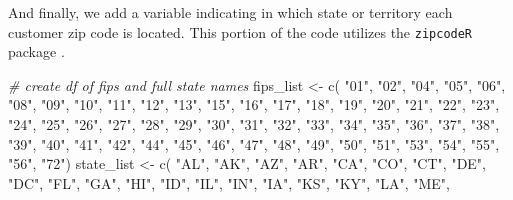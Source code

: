 \documentclass[
  11 pt,
  openany]{book}
\newenvironment{Shaded}{\begin{snugshade}}{\end{snugshade}}
\newcommand{\CommentTok}[1]{\textcolor[rgb]{0.56,0.35,0.01}{\textit{#1}}}
\newcommand{\FunctionTok}[1]{\textcolor[rgb]{0.00,0.00,0.00}{#1}}
\newcommand{\NormalTok}[1]{#1}
\newcommand{\OtherTok}[1]{\textcolor[rgb]{0.56,0.35,0.01}{#1}}
\newcommand{\StringTok}[1]{\textcolor[rgb]{0.31,0.60,0.02}{#1}}
\begin{document}
And finally, we add a variable indicating in which state or territory each customer zip code is located. This portion of the code utilizes the \texttt{zipcodeR} package \citep{R-zipcodeR}.

\begin{Shaded}
\begin{Highlighting}[]
\CommentTok{\# create df of fips and full state names}
\NormalTok{fips\_list }\OtherTok{\textless{}{-}} \FunctionTok{c}\NormalTok{(}
  \StringTok{"01"}\NormalTok{, }\StringTok{"02"}\NormalTok{, }\StringTok{"04"}\NormalTok{, }\StringTok{"05"}\NormalTok{, }\StringTok{"06"}\NormalTok{, }\StringTok{"08"}\NormalTok{, }\StringTok{"09"}\NormalTok{, }\StringTok{"10"}\NormalTok{, }\StringTok{"11"}\NormalTok{, }\StringTok{"12"}\NormalTok{, }
  \StringTok{"13"}\NormalTok{, }\StringTok{"15"}\NormalTok{, }\StringTok{"16"}\NormalTok{, }\StringTok{"17"}\NormalTok{, }\StringTok{"18"}\NormalTok{, }\StringTok{"19"}\NormalTok{, }\StringTok{"20"}\NormalTok{, }\StringTok{"21"}\NormalTok{, }\StringTok{"22"}\NormalTok{, }\StringTok{"23"}\NormalTok{, }
  \StringTok{"24"}\NormalTok{, }\StringTok{"25"}\NormalTok{, }\StringTok{"26"}\NormalTok{, }\StringTok{"27"}\NormalTok{, }\StringTok{"28"}\NormalTok{, }\StringTok{"29"}\NormalTok{, }\StringTok{"30"}\NormalTok{, }\StringTok{"31"}\NormalTok{, }\StringTok{"32"}\NormalTok{, }\StringTok{"33"}\NormalTok{, }
  \StringTok{"34"}\NormalTok{, }\StringTok{"35"}\NormalTok{, }\StringTok{"36"}\NormalTok{, }\StringTok{"37"}\NormalTok{, }\StringTok{"38"}\NormalTok{, }\StringTok{"39"}\NormalTok{, }\StringTok{"40"}\NormalTok{, }\StringTok{"41"}\NormalTok{, }\StringTok{"42"}\NormalTok{, }\StringTok{"44"}\NormalTok{, }
  \StringTok{"45"}\NormalTok{, }\StringTok{"46"}\NormalTok{, }\StringTok{"47"}\NormalTok{, }\StringTok{"48"}\NormalTok{, }\StringTok{"49"}\NormalTok{, }\StringTok{"50"}\NormalTok{, }\StringTok{"51"}\NormalTok{, }\StringTok{"53"}\NormalTok{, }\StringTok{"54"}\NormalTok{, }\StringTok{"55"}\NormalTok{, }
  \StringTok{"56"}\NormalTok{, }\StringTok{"72"}\NormalTok{)}
\NormalTok{state\_list }\OtherTok{\textless{}{-}} \FunctionTok{c}\NormalTok{(}
  \StringTok{"AL"}\NormalTok{, }\StringTok{"AK"}\NormalTok{, }\StringTok{"AZ"}\NormalTok{, }\StringTok{"AR"}\NormalTok{, }\StringTok{"CA"}\NormalTok{, }\StringTok{"CO"}\NormalTok{, }\StringTok{"CT"}\NormalTok{, }\StringTok{"DE"}\NormalTok{, }\StringTok{"DC"}\NormalTok{, }\StringTok{"FL"}\NormalTok{,}
  \StringTok{"GA"}\NormalTok{, }\StringTok{"HI"}\NormalTok{, }\StringTok{"ID"}\NormalTok{, }\StringTok{"IL"}\NormalTok{, }\StringTok{"IN"}\NormalTok{, }\StringTok{"IA"}\NormalTok{, }\StringTok{"KS"}\NormalTok{, }\StringTok{"KY"}\NormalTok{, }\StringTok{"LA"}\NormalTok{, }\StringTok{"ME"}\NormalTok{,}

\end{Highlighting}
\end{Shaded}
\end{document}
